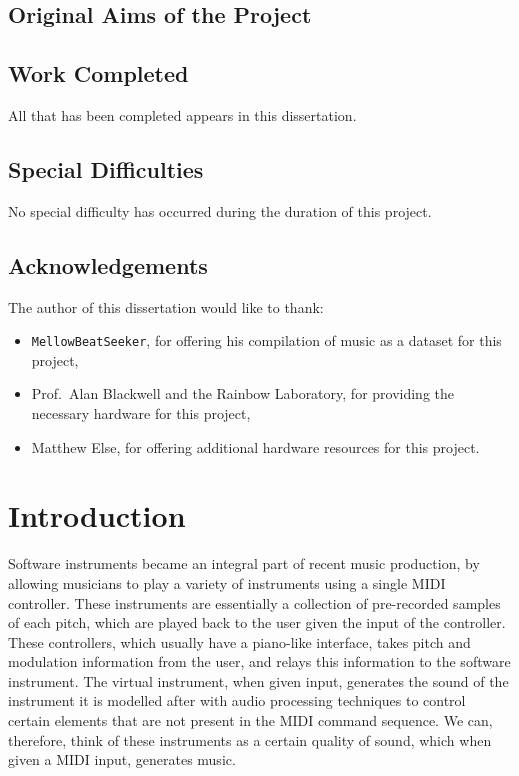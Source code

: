 \documentclass[12pt,a4paper,]{report}
\providecommand{\tightlist}{%
  \setlength{\itemsep}{0pt}\setlength{\parskip}{0pt}}
\begin{document}

\section*{Original Aims of the Project}

\section*{Work Completed}

All that has been completed appears in this dissertation.

\section*{Special Difficulties}

No special difficulty has occurred during the duration of this project.

\tableofcontents

\listoffigures

\newpage

\section*{Acknowledgements}

The author of this dissertation would like to thank:

\begin{itemize}
\tightlist
\item
  \texttt{MellowBeatSeeker}, for offering his compilation of music as a
  dataset for this project,
\item
  Prof.~Alan Blackwell and the Rainbow Laboratory, for providing the
  necessary hardware for this project,
\item
  Matthew Else, for offering additional hardware resources for this
  project.
\end{itemize}

\hypertarget{introduction}{%
\chapter{Introduction}\label{introduction}}

Software instruments became an integral part of recent music production,
by allowing musicians to play a variety of instruments using a single
MIDI controller. These instruments are essentially a collection of
pre-recorded samples of each pitch, which are played back to the user
given the input of the controller. These controllers, which usually have
a piano-like interface, takes pitch and modulation information from the
user, and relays this information to the software instrument. The
virtual instrument, when given input, generates the sound of the
instrument it is modelled after with audio processing techniques to
control certain elements that are not present in the MIDI command
sequence. We can, therefore, think of these instruments as a certain
quality of sound, which when given a MIDI input, generates music.
\end{document}
